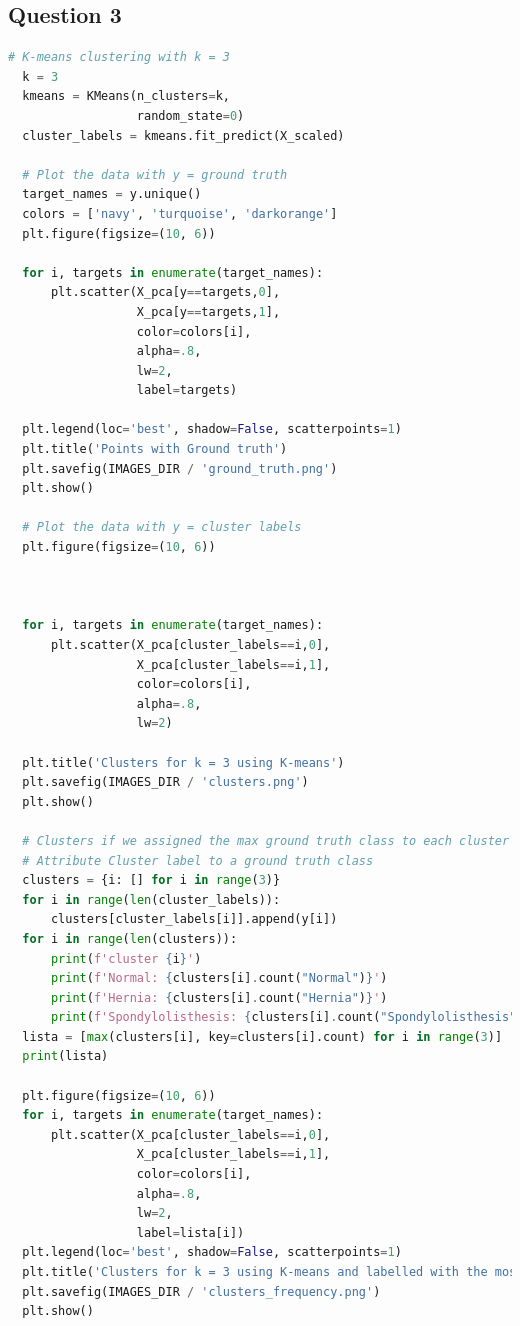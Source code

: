 \documentclass{article}
\begin{document}
\subsection*{Question 3}
\begin{lstlisting}[language=Python]
  # K-means clustering with k = 3
  k = 3
  kmeans = KMeans(n_clusters=k,
                  random_state=0)
  cluster_labels = kmeans.fit_predict(X_scaled)
  
  # Plot the data with y = ground truth
  target_names = y.unique()
  colors = ['navy', 'turquoise', 'darkorange']
  plt.figure(figsize=(10, 6))
  
  for i, targets in enumerate(target_names):
      plt.scatter(X_pca[y==targets,0],
                  X_pca[y==targets,1],
                  color=colors[i],
                  alpha=.8,
                  lw=2,
                  label=targets)
  
  plt.legend(loc='best', shadow=False, scatterpoints=1)
  plt.title('Points with Ground truth')
  plt.savefig(IMAGES_DIR / 'ground_truth.png')
  plt.show()
  
  # Plot the data with y = cluster labels
  plt.figure(figsize=(10, 6))
  
  
  
  for i, targets in enumerate(target_names):
      plt.scatter(X_pca[cluster_labels==i,0],
                  X_pca[cluster_labels==i,1],
                  color=colors[i],
                  alpha=.8,
                  lw=2)
  
  plt.title('Clusters for k = 3 using K-means')
  plt.savefig(IMAGES_DIR / 'clusters.png')
  plt.show()
  
  # Clusters if we assigned the max ground truth class to each cluster
  # Attribute Cluster label to a ground truth class
  clusters = {i: [] for i in range(3)}
  for i in range(len(cluster_labels)):
      clusters[cluster_labels[i]].append(y[i])
  for i in range(len(clusters)):
      print(f'cluster {i}')
      print(f'Normal: {clusters[i].count("Normal")}')
      print(f'Hernia: {clusters[i].count("Hernia")}')
      print(f'Spondylolisthesis: {clusters[i].count("Spondylolisthesis")}\n')
  lista = [max(clusters[i], key=clusters[i].count) for i in range(3)]
  print(lista)
  
  plt.figure(figsize=(10, 6))
  for i, targets in enumerate(target_names):
      plt.scatter(X_pca[cluster_labels==i,0],
                  X_pca[cluster_labels==i,1],
                  color=colors[i],
                  alpha=.8,
                  lw=2,
                  label=lista[i])
  plt.legend(loc='best', shadow=False, scatterpoints=1)
  plt.title('Clusters for k = 3 using K-means and labelled with the most frequent class')
  plt.savefig(IMAGES_DIR / 'clusters_frequency.png')
  plt.show()
\end{lstlisting}
\end{document}

